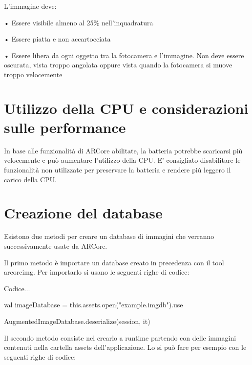 \documentclass[crop=false, class=book]{standalone}
\begin{document}
L’immagine deve:

•	Essere visibile almeno al 25\% nell'inquadratura

•	Essere piatta e non accartocciata

•	Essere libera da ogni oggetto tra la fotocamera e l'immagine. Non deve essere oscurata, vista troppo angolata oppure vista quando la fotocamera si muove troppo velocemente

\section{Utilizzo della CPU e considerazioni sulle performance}

In base alle funzionalità di ARCore abilitate, la batteria potrebbe scaricarsi più velocemente e può aumentare l’utilizzo della CPU. E’ consigliato disabilitare le funzionalità non utilizzate per preservare la batteria e rendere più leggero il carico della CPU.

\section{Creazione del database}

Esistono due metodi per creare un database di immagini che verranno successivamente usate da ARCore.

Il primo metodo è importare un database creato in precedenza con il tool arcoreimg.
Per importarlo si usano le seguenti righe di codice:

\begin{center}
	\begin{minipage}{0.95\textwidth}
	
	Codice...

val imageDatabase = this.assets.open("example.imgdb").use {

  AugmentedImageDatabase.deserialize(session, it)
  
}
	
	\end{minipage}
\end{center}

Il secondo metodo consiste nel crearlo a runtime partendo con delle immagini contenuti nella cartella assets dell’applicazione. Lo si può fare per esempio con le seguenti righe di codice:
\end{document}
